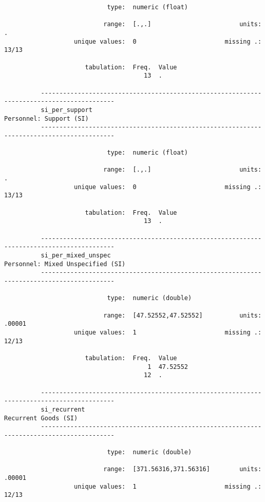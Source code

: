 \documentclass{article}
\begin{document}
\begin{verbatim}
                            type:  numeric (float)
          
                           range:  [.,.]                        units:  .
                   unique values:  0                        missing .:  13/13
          
                      tabulation:  Freq.  Value
                                      13  .
          
          ------------------------------------------------------------------------------------------
          si_per_support                                                     Personnel: Support (SI)
          ------------------------------------------------------------------------------------------
          
                            type:  numeric (float)
          
                           range:  [.,.]                        units:  .
                   unique values:  0                        missing .:  13/13
          
                      tabulation:  Freq.  Value
                                      13  .
          
          ------------------------------------------------------------------------------------------
          si_per_mixed_unspec                                      Personnel: Mixed Unspecified (SI)
          ------------------------------------------------------------------------------------------
          
                            type:  numeric (double)
          
                           range:  [47.52552,47.52552]          units:  .00001
                   unique values:  1                        missing .:  12/13
          
                      tabulation:  Freq.  Value
                                       1  47.52552
                                      12  .
          
          ------------------------------------------------------------------------------------------
          si_recurrent                                                          Recurrent Goods (SI)
          ------------------------------------------------------------------------------------------
          
                            type:  numeric (double)
          
                           range:  [371.56316,371.56316]        units:  .00001
                   unique values:  1                        missing .:  12/13
          

\end{verbatim}
\end{document}
